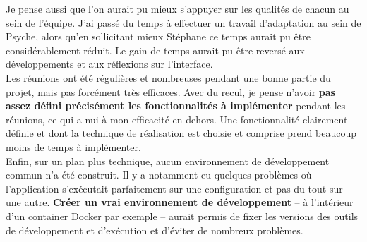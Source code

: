 Je pense aussi que l'on aurait pu mieux s'appuyer sur les qualités de chacun au sein de l'équipe. J'ai passé du temps à effectuer un travail d'adaptation au sein de Psyche, alors qu'en sollicitant mieux Stéphane ce temps aurait pu être considérablement réduit. Le gain de temps aurait pu être reversé aux développements et aux réflexions sur l'interface.\\

Les réunions ont été régulières et nombreuses pendant une bonne partie du projet, mais pas forcément très efficaces. Avec du recul, je pense n'avoir \textbf{pas assez défini précisément les fonctionnalités à implémenter} pendant les réunions, ce qui a nui à mon efficacité en dehors. Une fonctionnalité clairement définie et dont la technique de réalisation est choisie et comprise prend beaucoup moins de temps à implémenter.\\

Enfin, sur un plan plus technique, aucun environnement de développement commun n'a été construit. Il y a notamment eu quelques problèmes où l'application s'exécutait parfaitement sur une configuration et pas du tout sur une autre. \textbf{Créer un vrai environnement de développement} -- à l'intérieur d'un container Docker par exemple -- aurait permis de fixer les versions des outils de développement et d'exécution et d'éviter de nombreux problèmes.